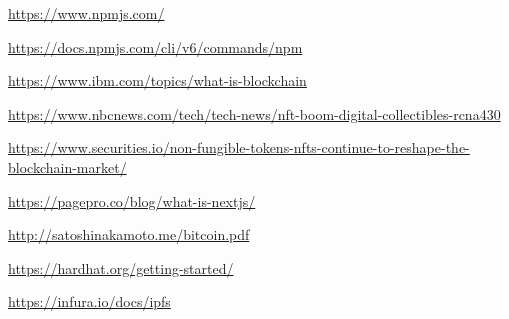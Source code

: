 \documentclass[a4paper,12pt]{article}
\begin{document}
%
%
\clearpage



\begin{flushleft}
\text{[1]} \url{https://www.npmjs.com/} 

\text{[2]} \url{https://docs.npmjs.com/cli/v6/commands/npm} 

\text{[3]} \url{https://www.ibm.com/topics/what-is-blockchain} 

\text{[4]} \url{https://www.nbcnews.com/tech/tech-news/nft-boom-digital-collectibles-rcna430} 

\text{[5]} \url{ https://www.securities.io/non-fungible-tokens-nfts-continue-to-reshape-the-blockchain-market/} 

\text{[6]} \url{https://pagepro.co/blog/what-is-nextjs/}

\text{[7]} \url{http://satoshinakamoto.me/bitcoin.pdf} 

\text{[8]} \url{https://hardhat.org/getting-started/} 

\text{[9]} \url{ https://infura.io/docs/ipfs} 

\end{flushleft}


%


%
%

\end{document}
